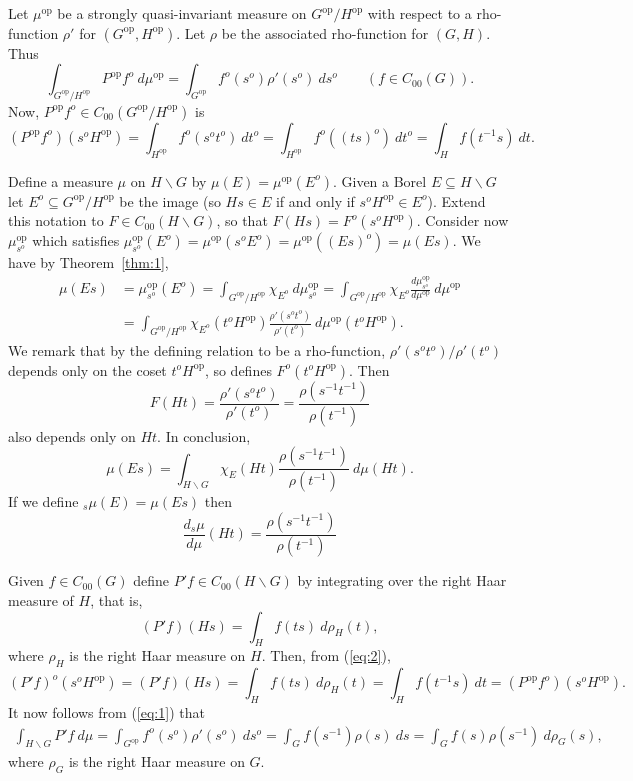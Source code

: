 \documentclass[11pt,a4paper]{article}
\theoremstyle{definition}
\newcommand{\bs}{\backslash}
\newcommand{\op}{{\operatorname{op}}}
\begin{document}
Let $\mu^\op$ be a strongly quasi-invariant measure on $G^\op / H^\op$ with respect to a
rho-function $\rho'$ for $(G^\op, H^\op)$.  Let $\rho$ be the associated rho-function for
$(G,H)$.  Thus
\begin{equation} \int_{G^\op / H^\op} P^\op f^o \ d\mu^\op
= \int_{G^\op} f^o(s^o) \rho'(s^o) \ ds^o \qquad (f\in C_{00}(G)). \label{eq:1}
\end{equation}
Now, $P^\op f^o \in C_{00}(G^\op/H^\op)$ is
\begin{equation} (P^\op f^o)(s^oH^\op) = \int_{H^\op} f^o(s^ot^o) \ dt^o
= \int_{H^\op} f^o((ts)^o) \ dt^o
= \int_H f(t^{-1}s) \ dt. \label{eq:2}
\end{equation}

Define a measure $\mu$ on $H\bs G$ by $\mu(E) = \mu^\op(E^o)$.
Given a Borel $E\subseteq H\bs G$ let $E^o\subseteq G^\op/H^\op$ be the image (so
$Hs\in E$ if and only if $s^o H^\op \in E^o$).
Extend this notation to $F\in C_{00}(H\bs G)$, so that $F(Hs) = F^o(s^o H^\op)$.  
Consider now $\mu^\op_{s^o}$ which satisfies
$\mu^\op_{s^o}(E^o) = \mu^\op(s^oE^o) = \mu^\op((Es)^o) = \mu(Es)$.
We have by Theorem~\ref{thm:1},
\begin{align*}
\mu(Es) &= \mu^\op_{s^o}(E^o) = \int_{G^\op/H^\op} \chi_{E^o} \ d\mu^\op_{s^o}
= \int_{G^\op/H^\op} \chi_{E^o} \frac{d\mu^\op_{s^o}}{d\mu^\op} \ d\mu^\op \\
&= \int_{G^\op/H^\op} \chi_{E^o}(t^oH^\op) \frac{\rho'(s^ot^o)}{\rho'(t^o)} \ d\mu^\op(t^oH^\op).
\end{align*}
We remark that by the defining relation to be a rho-function, $\rho'(s^ot^o) / \rho'(t^o)$
depends only on the coset $t^oH^\op$, so defines $F^o(t^oH^\op)$.  Then
\[ F(Ht) = \frac{\rho'(s^ot^o)}{\rho'(t^o)} = \frac{\rho(s^{-1}t^{-1})}{\rho(t^{-1})} \]
also depends only on $Ht$.  In conclusion,
\[ \mu(Es) = \int_{H\bs G} \chi_E(Ht) \frac{\rho(s^{-1}t^{-1})}{\rho(t^{-1})} \ d\mu(Ht). \]
If we define ${}_s\mu(E) = \mu(Es)$ then 
\begin{equation}
\frac{d{{}_s\mu}}{d\mu}(Ht) = \frac{\rho(s^{-1}t^{-1})}{\rho(t^{-1})}
\label{eq:4}
\end{equation}

Given $f\in C_{00}(G)$ define $P'f \in C_{00}(H\bs G)$ by integrating over the right
Haar measure of $H$, that is,
\[ (P'f)(Hs) = \int_H f(ts) \ d\rho_H(t), \]
where $\rho_H$ is the right Haar measure on $H$.  Then, from (\ref{eq:2}),
\begin{equation} (P'f)^o(s^o H^\op) = (P'f)(Hs) = \int_H f(ts) \ d\rho_H(t)
= \int_H f(t^{-1}s) \ dt = (P^\op f^o)(s^oH^\op). \label{eq:3}
\end{equation}
It now follows from (\ref{eq:1}) that
\begin{align}
\int_{H\bs G} P'f \ d\mu = \int_{G^\op} f^o(s^o) \rho'(s^o) \ ds^o
= \int_G f(s^{-1}) \rho(s) \ ds
= \int_G f(s) \rho(s^{-1}) \ d\rho_G(s), \label{eq:5}
\end{align}
where $\rho_G$ is the right Haar measure on $G$.
\end{document}
